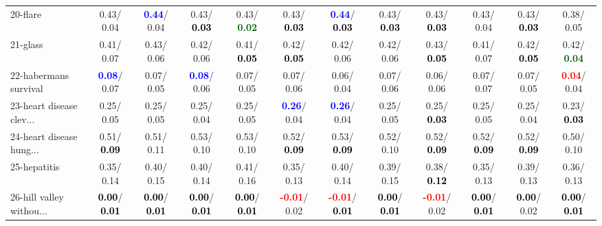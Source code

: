 \begin{table}[h]
\begin{center}
{\begin{tabular}{lc|c|c|c|c|c|c|c|c|c|c}
20-flare &   0.43/  0.04 & \textcolor{blue}{\textbf{  0.44}}/  0.04 &   0.43/\textcolor{black}{\textbf{  0.03}} &   0.43/\textcolor{darkgreen}{\textbf{  0.02}} &   0.43/\textcolor{black}{\textbf{  0.03}} & \textcolor{blue}{\textbf{  0.44}}/\textcolor{black}{\textbf{  0.03}} &   0.43/\textcolor{black}{\textbf{  0.03}} &   0.43/\textcolor{black}{\textbf{  0.03}} &   0.43/  0.04 &   0.43/\textcolor{black}{\textbf{  0.03}} &   0.38/  0.05 \\
21-glass &   0.41/  0.07 &   0.43/  0.06 &   0.42/  0.06 &   0.41/\textcolor{black}{\textbf{  0.05}} &   0.42/\textcolor{black}{\textbf{  0.05}} &   0.42/  0.06 &   0.42/  0.06 &   0.43/\textcolor{black}{\textbf{  0.05}} &   0.41/  0.07 &   0.42/\textcolor{black}{\textbf{  0.05}} &   0.42/\textcolor{darkgreen}{\textbf{  0.04}} \\ \hline
22-habermans survival & \textcolor{blue}{\textbf{  0.08}}/  0.07 &   0.07/  0.05 & \textcolor{blue}{\textbf{  0.08}}/  0.06 &   0.07/  0.05 &   0.07/  0.06 &   0.06/  0.04 &   0.07/  0.06 &   0.06/  0.06 &   0.07/  0.07 &   0.07/  0.05 & \textcolor{red}{\textbf{  0.04}}/  0.04 \\
23-heart disease clev... &   0.25/  0.05 &   0.25/  0.05 &   0.25/  0.04 &   0.25/  0.05 & \textcolor{blue}{\textbf{  0.26}}/  0.04 & \textcolor{blue}{\textbf{  0.26}}/  0.04 &   0.25/  0.05 &   0.25/\textcolor{black}{\textbf{  0.03}} &   0.25/  0.05 &   0.25/  0.04 &   0.23/\textcolor{black}{\textbf{  0.03}} \\
24-heart disease hung... &   0.51/\textcolor{black}{\textbf{  0.09}} &   0.51/  0.11 &   0.53/  0.10 &   0.53/  0.10 &   0.52/\textcolor{black}{\textbf{  0.09}} &   0.53/\textcolor{black}{\textbf{  0.09}} &   0.52/  0.10 &   0.52/\textcolor{black}{\textbf{  0.09}} &   0.52/\textcolor{black}{\textbf{  0.09}} &   0.52/\textcolor{black}{\textbf{  0.09}} &   0.50/  0.10 \\
25-hepatitis &   0.35/  0.14 &   0.40/  0.15 &   0.40/  0.14 &   0.41/  0.16 &   0.35/  0.13 &   0.40/  0.14 &   0.39/  0.15 &   0.38/\textcolor{black}{\textbf{  0.12}} &   0.35/  0.13 &   0.39/  0.13 &   0.36/  0.13 \\
26-hill valley withou... & \textcolor{black}{\textbf{  0.00}}/\textcolor{black}{\textbf{  0.01}} & \textcolor{black}{\textbf{  0.00}}/\textcolor{black}{\textbf{  0.01}} & \textcolor{black}{\textbf{  0.00}}/\textcolor{black}{\textbf{  0.01}} & \textcolor{black}{\textbf{  0.00}}/\textcolor{black}{\textbf{  0.01}} & \textcolor{red}{\textbf{ -0.01}}/  0.02 & \textcolor{red}{\textbf{ -0.01}}/\textcolor{black}{\textbf{  0.01}} & \textcolor{black}{\textbf{  0.00}}/\textcolor{black}{\textbf{  0.01}} & \textcolor{red}{\textbf{ -0.01}}/  0.02 & \textcolor{black}{\textbf{  0.00}}/\textcolor{black}{\textbf{  0.01}} & \textcolor{black}{\textbf{  0.00}}/  0.02 & \textcolor{black}{\textbf{  0.00}}/\textcolor{black}{\textbf{  0.01}} \\

\end{tabular}}
\end{center}
\end{table}
